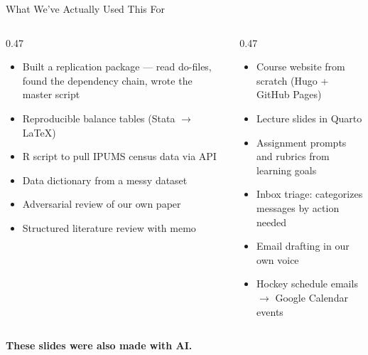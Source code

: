 \documentclass[aspectratio=169, 10pt]{beamer}
\begin{document}
\begin{frame}{What We've Actually Used This For}
\begin{columns}[T]
\begin{column}{0.47\textwidth}
\begin{tcolorbox}[keybox, title={\faFlask\quad Research}]
\scriptsize
\begin{itemize}\setlength{\itemsep}{0pt}
  \item Built a replication package --- read do-files, found the dependency chain, wrote the master script
  \item Reproducible balance tables (Stata $\rightarrow$ \LaTeX)
  \item R script to pull IPUMS census data via API
  \item Data dictionary from a messy dataset
  \item Adversarial review of our own paper
  \item Structured literature review with memo
\end{itemize}
\end{tcolorbox}
\end{column}
\begin{column}{0.47\textwidth}
\begin{tcolorbox}[keybox, title={\faChalkboard\quad Teaching \& Workflow}]
\scriptsize
\begin{itemize}\setlength{\itemsep}{0pt}
  \item Course website from scratch (Hugo + GitHub Pages)
  \item Lecture slides in Quarto
  \item Assignment prompts and rubrics from learning goals
  \item Inbox triage: categorizes messages by action needed
  \item Email drafting in our own voice
  \item Hockey schedule emails $\rightarrow$ Google Calendar events
\end{itemize}
\end{tcolorbox}
\end{column}
\end{columns}
\vskip4pt
\begin{tcolorbox}[accentbox, halign=center, width=8cm, top=3pt, bottom=3pt]
\small\bfseries These slides were also made with AI.
\end{tcolorbox}
\end{frame}
\end{document}
